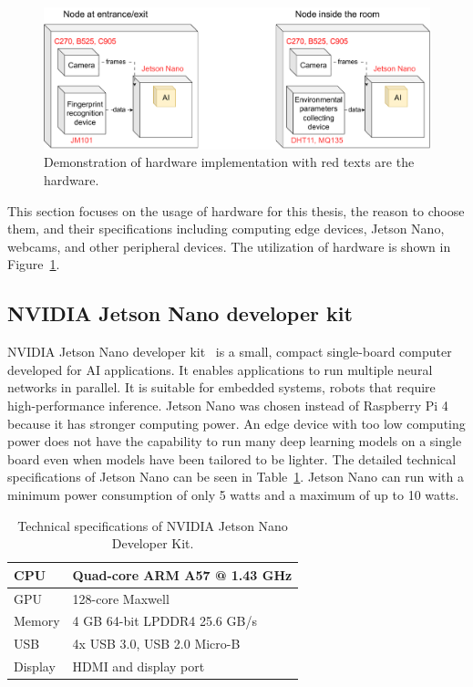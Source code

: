 \documentclass[../main.tex]{subfiles}
\begin{document}
\begin{figure}[h!]
\centering
\includegraphics[width=\linewidth]{Figure/hardware.pdf}
\caption{Demonstration of hardware implementation with red texts are the hardware.}
\label{fig:hardware}
\end{figure}

This section focuses on the usage of hardware for this thesis, the reason to choose them, and their specifications including computing edge devices, Jetson Nano, webcams, and other peripheral devices. The utilization of hardware is shown in Figure~\ref{fig:hardware}.

\subsection{NVIDIA Jetson Nano developer kit}
\label{subsec:jetsonnano}
NVIDIA Jetson Nano developer kit~\cite{jetsonnano} is a small, compact single-board computer developed for AI applications. It enables applications to run multiple neural networks in parallel. It is suitable for embedded systems, robots that require high-performance inference. Jetson Nano was chosen instead of Raspberry Pi 4~\cite{raspberry} because it has stronger computing power. An edge device with too low computing power does not have the capability to run many deep learning models on a single board even when models have been tailored to be lighter. The detailed technical specifications of Jetson Nano can be seen in Table~\ref{table:jetson}. Jetson Nano can run with a minimum power consumption of only 5 watts and a maximum of up to 10 watts.

\begin{table}[h!]
\centering
\begin{tabular}{||l | l ||} 
\hline 
CPU & Quad-core ARM A57 @ 1.43 GHz \\
\hline
GPU & 128-core Maxwell \\
\hline
Memory & 4 GB 64-bit LPDDR4 25.6 GB/s \\ 
\hline
USB & 4x USB 3.0, USB 2.0 Micro-B \\ 
\hline
Display & HDMI and display port \\ 
\hline
\end{tabular}
\caption{Technical specifications of NVIDIA Jetson Nano Developer Kit.}
\label{table:jetson}
\end{table}
\end{document}
